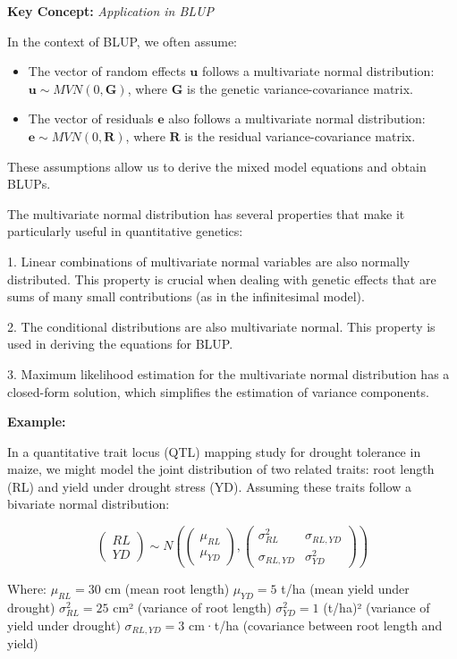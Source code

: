 \documentclass[12pt,a4paper]{article}
\newenvironment{keyconceptbox}[1][]
{\begin{basebox}[linecolor=uqblue]
\textbf{\color{uqblue}Key Concept:} \textit{#1}\par\noindent\ignorespaces}
{\end{basebox}}
\newenvironment{example}[1][]
{\begin{basebox}[linecolor=uqgold]
\textbf{\color{uqgold}Example:} \textit{#1}\par\noindent\ignorespaces}
{\end{basebox}}
\begin{document}
\begin{keyconceptbox}[Application in BLUP]
In the context of BLUP, we often assume:

\begin{itemize}
    \item The vector of random effects $\mathbf{u}$ follows a multivariate normal distribution: 
    $\mathbf{u} \sim MVN(0, \mathbf{G})$, where $\mathbf{G}$ is the genetic variance-covariance matrix.
    \item The vector of residuals $\mathbf{e}$ also follows a multivariate normal distribution: 
    $\mathbf{e} \sim MVN(0, \mathbf{R})$, where $\mathbf{R}$ is the residual variance-covariance matrix.
\end{itemize}

These assumptions allow us to derive the mixed model equations and obtain BLUPs.
\end{keyconceptbox}

The multivariate normal distribution has several properties that make it particularly useful in quantitative genetics:

1. Linear combinations of multivariate normal variables are also normally distributed. This property is crucial when dealing with genetic effects that are sums of many small contributions (as in the infinitesimal model).

2. The conditional distributions are also multivariate normal. This property is used in deriving the equations for BLUP.

3. Maximum likelihood estimation for the multivariate normal distribution has a closed-form solution, which simplifies the estimation of variance components.

\begin{example}
In a quantitative trait locus (QTL) mapping study for drought tolerance in maize, we might model the joint distribution of two related traits: root length (RL) and yield under drought stress (YD). Assuming these traits follow a bivariate normal distribution:

\[
\begin{pmatrix} RL \\ YD \end{pmatrix} \sim N\left(\begin{pmatrix} \mu_{RL} \\ \mu_{YD} \end{pmatrix}, \begin{pmatrix} \sigma^2_{RL} & \sigma_{RL,YD} \\ \sigma_{RL,YD} & \sigma^2_{YD} \end{pmatrix}\right)
\]

Where:
$\mu_{RL} = 30$ cm (mean root length)
$\mu_{YD} = 5$ t/ha (mean yield under drought)
$\sigma^2_{RL} = 25$ cm² (variance of root length)
$\sigma^2_{YD} = 1$ (t/ha)² (variance of yield under drought)
$\sigma_{RL,YD} = 3$ cm·t/ha (covariance between root length and yield)
\end{example}
\end{document}
